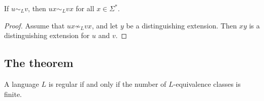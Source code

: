 \begin{page}
\setcounter{section}{4}
\setcounter{subsection}{1}
\setcounter{dfn}{6}
\label{portion:1189}

\begin{lem}
\label{lem:LEquivRInvar}
If $u \sim_L v$, then $ux \sim_L vx$ for all $x \in \Sigma^*$.
\end{lem}

\end{page}

\begin{page}
\setcounter{section}{4}
\setcounter{subsection}{2}
\setcounter{dfn}{6}
\label{portion:1190}

\begin{proof}
Assume that $ux \not\sim_L vx$, and let $y$ be a distinguishing extension.
Then $xy$ is a distinguishing extension for $u$ and $v$.
\end{proof}




\end{page}

\begin{page}
\setcounter{section}{4}
\setcounter{subsection}{2}
\setcounter{dfn}{6}
\label{portion:1192}

\subsection{The theorem}

\end{page}

\begin{page}
\setcounter{section}{4}
\setcounter{subsection}{2}
\setcounter{dfn}{7}
\label{portion:1194}

\begin{thm}
A language $L$ is regular if and only if the number of $L$-equivalence classes is finite.
\end{thm}

\end{page}

